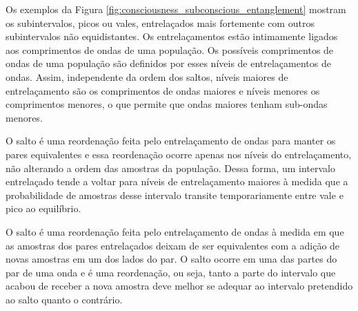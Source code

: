 Os exemplos da Figura \ref{fig:consciousness_subconscious_entanglement} mostram os subintervalos, picos ou vales, entrelaçados mais fortemente com outros subintervalos não equidistantes. Os entrelaçamentos estão intimamente ligados aos comprimentos de ondas de uma população. Os possíveis comprimentos de ondas de uma população são definidos por esses níveis de entrelaçamentos de ondas. Assim, independente da ordem dos saltos, níveis maiores de entrelaçamento são os comprimentos de ondas maiores e níveis menores os comprimentos menores, o que permite que ondas maiores tenham sub-ondas menores. 

O salto é uma reordenação feita pelo entrelaçamento de ondas para manter os pares equivalentes e essa reordenação ocorre apenas nos níveis do entrelaçamento, não alterando a ordem das amostras da população. Dessa forma, um intervalo entrelaçado tende a voltar para níveis de entrelaçamento maiores à medida que a probabilidade de amostras desse intervalo transite temporariamente entre vale e pico ao equilíbrio.

O salto é uma reordenação feita pelo entrelaçamento de ondas à medida em que as amostras dos pares entrelaçados deixam de ser equivalentes com a adição de novas amostras em um dos lados do par. O salto ocorre em uma das partes do par de uma onda e é uma reordenação, ou seja, tanto a parte do intervalo que acabou de receber a nova amostra deve melhor se adequar ao intervalo pretendido ao salto quanto o contrário.

